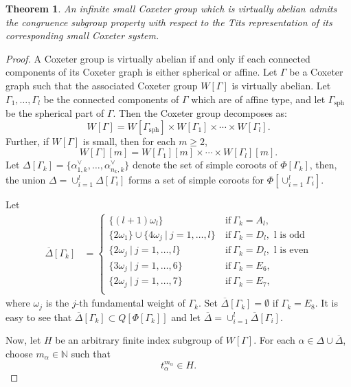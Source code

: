 \documentclass[12pt]{amsart}
\newtheorem{theorem}[equation]{Theorem}
\theoremstyle{definition}
\numberwithin{equation}{section}
\begin{document}
  \begin{theorem}\label{thm:cspaffine}
An infinite small Coxeter group which is virtually abelian admits the congruence subgroup property with respect to the Tits representation of its corresponding small Coxeter system.
\end{theorem}
\begin{proof}
A Coxeter group is virtually abelian if and only if each connected components of its Coxeter graph is either spherical or affine. Let $\Gamma$ be a Coxeter graph such that the associated Coxeter group $W[\Gamma]$ is virtually abelian. Let $\Gamma_1, \ldots, \Gamma_l$ be the connected components of $\Gamma$ which are of affine type, and let $\Gamma_{\mathrm{sph}}$ be the spherical part of $\Gamma$. Then the Coxeter group decomposes as:
$$
W[\Gamma] = W[\Gamma_{\mathrm{sph}}] \times W[\Gamma_1] \times \cdots \times W[\Gamma_l].
$$
Further, if $W[\Gamma]$ is small, then for each $m\geq 2$, 
$$
W[\Gamma][m] = W[\Gamma_1][m] \times \cdots \times W[\Gamma_l][m].
$$
 Let $\Delta[\Gamma_k]=\{\alpha_{1,k}^{\vee},\ldots, \alpha_{n_k, k}^{\vee}\}$ denote the set of simple coroots of $\Phi[\Gamma_k]$, then, the union  $\Delta=\cup_{i=1}^l \Delta[\Gamma_i]$ forms a set of simple coroots for $\Phi[\cup_{i=1}^l \Gamma_i]$. 
 
 Let $$
 \begin{aligned}
 \overline{\Delta}[\Gamma_k]&=\begin{cases}\{(l+1)\omega_l\}  & ~\text {if} ~\Gamma_k=A_{l},\\
 \{2\omega_1\}\cup \{4\omega_j~|~ j=1,\ldots, l\}  & ~\text {if} ~\Gamma_k=D_l, \text{ l is odd}\\
  \{2\omega_j~|~ j=1,\ldots, l\}  & ~\text {if} ~\Gamma_k=D_l, \text{ l is even}\\
 \{3\omega_j ~|~ j=1,\ldots, 6\}  & ~\text {if} ~\Gamma_k=E_6,\\
 \{2\omega_j ~|~ j=1,\ldots, 7\}  & ~\text {if} ~\Gamma_k=E_7,\\
 \end{cases}
 \end{aligned}
 $$
 where $\omega_j$ is the $j$-th fundamental weight of $\Gamma_k$. Set $\overline{\Delta}[\Gamma_k]=\emptyset$ if $\Gamma_k=E_8$. It is easy to see that $\overline{\Delta}[\Gamma_k]\subset Q[\Phi[\Gamma_k]]$ and let $\overline{\Delta}=\cup_{i=1}^l \overline{\Delta}[\Gamma_i]$.
 
 
 Now, let $H$ be an arbitrary finite index subgroup of $W[\Gamma]$. For each $\alpha\in \Delta\cup\overline{\Delta}$, choose $m_{\alpha}\in \mathbb N$ such that $$t^{m_{\alpha}}_{\alpha} \in H.$$



\end{proof}
\end{document}
